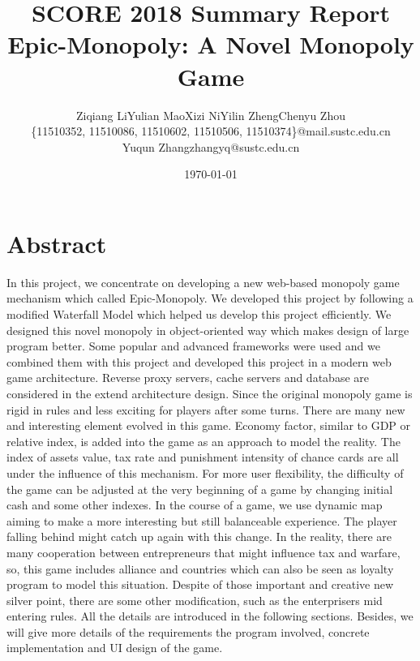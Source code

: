 \documentclass[a4paper,11pt]{article}
\begin{document}

\title{SCORE 2018 Summary Report\\Epic-Monopoly: A Novel Monopoly Game}
\author{\small Ziqiang Li\quad Yulian Mao\quad Xizi Ni\quad Yilin Zheng\quad Chenyu Zhou\\
\small \{11510352, 11510086, 11510602, 11510506, 11510374\}@mail.sustc.edu.cn\\
Yuqun Zhang\quad zhangyq@sustc.edu.cn}
\date{\today}



\maketitle


\section{Abstract}
In this project, we concentrate on developing a new web-based monopoly game mechanism which called Epic-Monopoly. We developed this project by following a modified Waterfall Model which helped us develop this project efficiently. We designed this novel monopoly in object-oriented way which makes design of large program better. Some popular and advanced frameworks were used and we combined them with this project and developed this project in a modern web game architecture. Reverse proxy servers, cache servers and database are considered in the extend architecture design. Since the original monopoly game is rigid in rules and less exciting for players after some turns. There are many new and interesting element evolved in this game. Economy factor, similar to GDP or relative index, is added into the game as an approach to model the reality. The index of assets value, tax rate and punishment intensity of chance cards are all under the influence of this mechanism. For more user flexibility, the difficulty of the game can be adjusted at the very beginning of a game by changing initial cash and some other indexes. In the course of a game, we use dynamic map aiming to make a more interesting but still balanceable experience. The player falling behind might catch up again with this change. In the reality, there are many cooperation between entrepreneurs that might influence tax and warfare, so, this game includes alliance and countries which can also be seen as loyalty program to model this situation. Despite of those important and creative new silver point, there are some other modification, such as the enterprisers mid entering rules. All the details are introduced in the following sections. Besides, we will give more details of the requirements the program involved, concrete implementation and UI design of the game.
\end{document}
